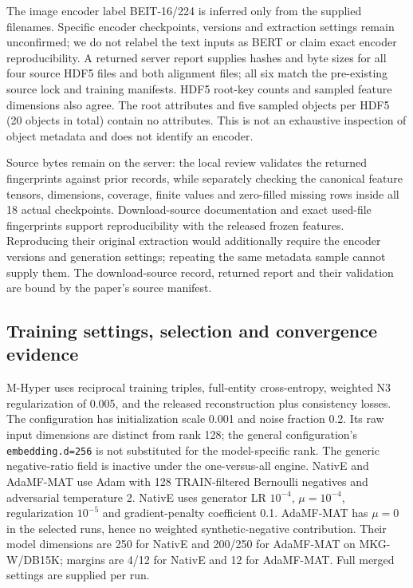\documentclass[11pt,a4paper]{article}
\begin{document}
The image encoder label BEIT-16/224 is inferred only from the supplied filenames. Specific encoder checkpoints, versions and extraction settings remain unconfirmed; we do not relabel the text inputs as BERT or claim exact encoder reproducibility. A returned server report supplies hashes and byte sizes for all four source HDF5 files and both alignment files; all six match the pre-existing source lock and training manifests. HDF5 root-key counts and sampled feature dimensions also agree. The root attributes and five sampled objects per HDF5 (20 objects in total) contain no attributes. This is not an exhaustive inspection of object metadata and does not identify an encoder.

Source bytes remain on the server: the local review validates the returned fingerprints against prior records, while separately checking the canonical feature tensors, dimensions, coverage, finite values and zero-filled missing rows inside all 18 actual checkpoints. Download-source documentation and exact used-file fingerprints support reproducibility with the released frozen features. Reproducing their original extraction would additionally require the encoder versions and generation settings; repeating the same metadata sample cannot supply them. The download-source record, returned report and their validation are bound by the paper's source manifest.

\subsection{Training settings, selection and convergence evidence}

M-Hyper uses reciprocal training triples, full-entity cross-entropy, weighted N3 regularization of 0.005, and the released reconstruction plus consistency losses. The configuration has initialization scale 0.001 and noise fraction 0.2. Its raw input dimensions are distinct from rank 128; the general configuration's \texttt{embedding.d=256} is not substituted for the model-specific rank. The generic negative-ratio field is inactive under the one-versus-all engine. NativE and AdaMF-MAT use Adam with 128 TRAIN-filtered Bernoulli negatives and adversarial temperature 2. NativE uses generator LR $10^{-4}$, $\mu=10^{-4}$, regularization $10^{-5}$ and gradient-penalty coefficient 0.1. AdaMF-MAT has $\mu=0$ in the selected runs, hence no weighted synthetic-negative contribution. Their model dimensions are 250 for NativE and 200/250 for AdaMF-MAT on MKG-W/DB15K; margins are 4/12 for NativE and 12 for AdaMF-MAT. Full merged settings are supplied per run.
\end{document}
